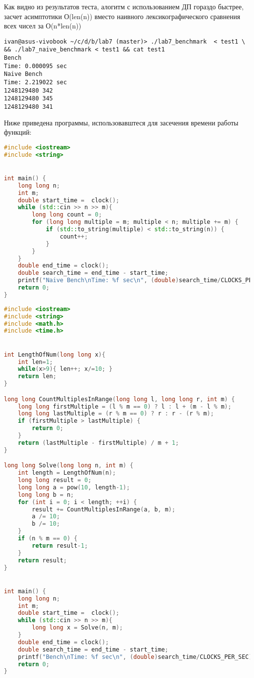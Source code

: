 \documentclass[12pt]{article}
\begin{document}
Как видно из результатов теста, алогитм с использованием ДП гораздо быстрее, засчет асимптотики О(len(n)) вместо наивного лексикографического сравнения всех чисел за О(n*len(n))

\begin{lstlisting}
ivan@asus-vivobook ~/c/d/b/lab7 (master)> ./lab7_benchmark  < test1 \
&& ./lab7_naive_benchmark < test1 && cat test1
Bench
Time: 0.000095 sec
Naive Bench
Time: 2.219022 sec
1248129480 342
1248129480 345
1248129480 341
\end{lstlisting}



Ниже приведена программы, использовавштеся для засечения времени работы функций:
\begin{lstlisting}[language=C++]
#include <iostream>
#include <string>


int main() {
    long long n;
    int m;
    double start_time =  clock();
    while (std::cin >> n >> m){
        long long count = 0;
        for (long long multiple = m; multiple < n; multiple += m) {
            if (std::to_string(multiple) < std::to_string(n)) {
                count++;
            }
        }
    }
    double end_time = clock();
    double search_time = end_time - start_time;
    printf("Naive Bench\nTime: %f sec\n", (double)search_time/CLOCKS_PER_SEC);
    return 0;
}
\end{lstlisting}

\begin{lstlisting}[language=C++]
#include <iostream>
#include <string>
#include <math.h>
#include <time.h>


int LengthOfNum(long long x){
    int len=1;
    while(x>9){ len++; x/=10; }
    return len;
}

long long CountMultiplesInRange(long long l, long long r, int m) {
    long long firstMultiple = (l % m == 0) ? l : l + (m - l % m);
    long long lastMultiple = (r % m == 0) ? r : r - (r % m);
    if (firstMultiple > lastMultiple) {
        return 0;
    }
    return (lastMultiple - firstMultiple) / m + 1;
}

long long Solve(long long n, int m) {
    int length = LengthOfNum(n);
    long long result = 0;
    long long a = pow(10, length-1);
    long long b = n; 
    for (int i = 0; i < length; ++i) {
        result += CountMultiplesInRange(a, b, m);
        a /= 10;
        b /= 10;
    }
    if (n % m == 0) {
        return result-1;
    }
    return result;
}


int main() {
    long long n;
    int m;
    double start_time =  clock();
    while (std::cin >> n >> m){
        long long x = Solve(n, m);
    }
    double end_time = clock();
    double search_time = end_time - start_time;
    printf("Bench\nTime: %f sec\n", (double)search_time/CLOCKS_PER_SEC);
    return 0;
}
\end{lstlisting}
\end{document}
